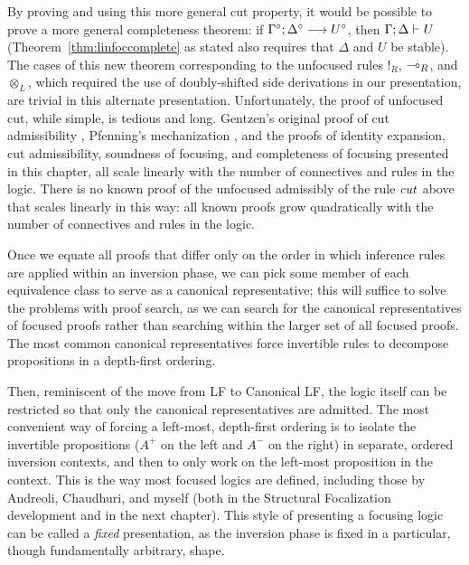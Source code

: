 By proving and using this more general cut property, it would be
possible to prove a more general completeness theorem: if 
${\Gamma^\circ};{\Delta^\circ} \longrightarrow {U^\circ} \mathstrut$, then ${\Gamma};{\Delta} \vdash {U} \mathstrut$
(Theorem~\ref{thm:linfoccomplete} as stated also requires that $\Delta$
and $U$ be stable). The cases of this new 
theorem corresponding to the unfocused rules ${!}_R$,
${\multimap}_R$, and ${\otimes}_L$, which required the use of
doubly-shifted side derivations in our presentation, are trivial in this
alternate presentation.  Unfortunately, the proof of unfocused cut,
while simple, is tedious and long. Gentzen's original proof of cut
admissibility \cite{gentzen35untersuchungen}, Pfenning's mechanization
\cite{pfenning00structural}, and the proofs of identity expansion, cut
admissibility, soundness of focusing, and completeness of focusing
presented in this chapter, all scale linearly with the number of
connectives and rules in the logic. There is no known proof of the
unfocused admissibly of the rule ${\it cut}$ above that scales
linearly in this way: all known proofs grow quadratically with the
number of connectives and rules in the logic.

%
Once we equate all proofs that differ only on the order
in which inference rules are applied within an inversion phase, 
we can pick some member of
each equivalence class
to serve as a canonical representative; this will suffice
to solve the problems with proof search, as we can search for 
the canonical representatives of focused proofs rather than searching
within the larger set of all focused proofs. The most common canonical
representatives force invertible rules to decompose propositions 
in a depth-first ordering. 

Then, reminiscent of the move from LF to Canonical LF, the logic
itself can be restricted so that only the canonical representatives
are admitted. The most convenient way of forcing a left-most,
depth-first ordering is to isolate the invertible propositions ($A^+$
on the left and $A^-$ on the right) in separate, ordered inversion
contexts, and then to only work on the left-most proposition in the
context. This is the way most focused logics are defined, including
those by Andreoli, Chaudhuri, and myself (both in the Structural
Focalization development and in the next chapter). This style of 
presenting a focusing logic can be called a {\it fixed} presentation,
as the inversion phase is fixed in a particular, though
fundamentally arbitrary, shape. 

